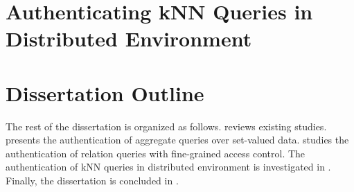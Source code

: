 \section{Authenticating {kNN} Queries in Distributed Environment}

\section{Dissertation Outline}

The rest of the dissertation is organized as follows.  reviews existing studies.  presents the authentication of aggregate queries over set-valued data.  studies the authentication of relation queries with fine-grained access control. The authentication of {kNN} queries in distributed environment is investigated in . Finally, the dissertation is concluded in .
